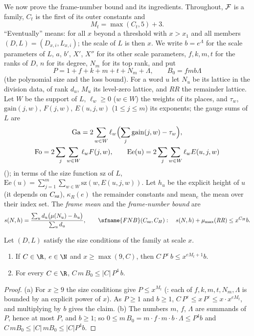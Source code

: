 We now prove the frame-number bound and its ingredients. Throughout, $\mathcal{F}$ is a family, $C_t$ is the
first of its outer constants and
\[
M_t=\max(C_t,5)+3 .
\]
``Eventually'' means: for all $x$ beyond a threshold with $x>x_1$ and all members $(D,L)=(D_{x,i},L_{x,i})$; the
scale of $L$ is then $x$. We write $b=e^\Lambda$ for the scale parameters of $L$, $a$, $b'$, $X'$, $X''$ for its other
scale parameters, $f,k,m,t$ for the ranks of $D$, $n$ for its degree, $N_m$ for its top rank, and put
\[
P=1+f+k+m+t+N_m+\Lambda,\qquad B_0=fmb\Lambda
\]
(the polynomial size and the loss bound). For a word $u$ let $N_u$ be its lattice in the division data, of rank
$d_u$, $M_u$ its level-zero lattice, and $\mathit{RR}$ the remainder lattice. Let $W$ be the support of $L$,
$\ell_w\ge0$ ($w\in W$) the weights of its places, and $\tau_w$, $\mathrm{gain}(j,w)$, $F(j,w)$, $E(u,j,w)$
($1\le j\le m$) its exponents; the gauge sums of $L$ are
\begin{gather*}
\mathrm{Ga}=2\sum_{w\in W}\ell_w\Bigl(\sum_j\mathrm{gain}(j,w)-\tau_w\Bigr),\\
\mathrm{Fo}=2\sum_j\sum_{w\in W}\ell_wF(j,w),\qquad
\mathrm{Ee}(u)=2\sum_j\sum_{w\in W}\ell_wE(u,j,w)
\end{gather*}
(); in terms of the size function $\mathrm{sz}$ of $L$,
$\mathrm{Ee}(u)=\sum_{j=1}^m\sum_{w\in W}\mathrm{sz}(w,E(u,j,w))$. Let $h_u$ be the explicit height of $u$ (it
depends on $C_{\rm sz}$), $\kappa_R(e)$ the remainder constants and $\mathrm{mean}_e$ the mean over their index set.
The \emph{frame mean} and the \emph{frame-number bound} are
\[
s(N,h)=\frac{\sum_ud_u\bigl(\mu(N_u)-h_u\bigr)}{\sum_ud_u},\qquad
\sfname{FNB}(C_{\rm sz},C_H):\quad s(N,h)+\mu_{\max}(\mathit{RR})\le x^{C_H}b .
\]

\begin{lemma}\label{pf:top-shape:bpol}
Let $(D,L)$ satisfy the size conditions of the family at scale $x$.
\begin{enumerate}[label=(\alph*)]
\item If $C\in\R$, $e\in\N$ and $x\ge\max(9,C)$, then $C\,P^e\,b\le x^{eM_t+1}b$.
\item For every $C\in\R$, $C\,m\,B_0\le|C|\,P^4\,b$.
\end{enumerate}
\end{lemma}

\begin{proof}
(a) For $x\ge9$ the size conditions give $P\le x^{M_t}$
(: each of $f,k,m,t,N_m,\Lambda$ is bounded by an explicit
power of $x$). As $P\ge1$ and $b\ge1$, $C\,P^e\le x\,P^e\le x\cdot x^{eM_t}$, and multiplying by $b$ gives the claim.
(b) The numbers $m$, $f$, $\Lambda$ are summands of $P$, hence at most $P$, and $b\ge1$; so
$0\le m\,B_0=m\cdot f\cdot m\cdot b\cdot\Lambda\le P^4b$ and $C\,mB_0\le|C|\,mB_0\le|C|P^4b$.
\end{proof}

